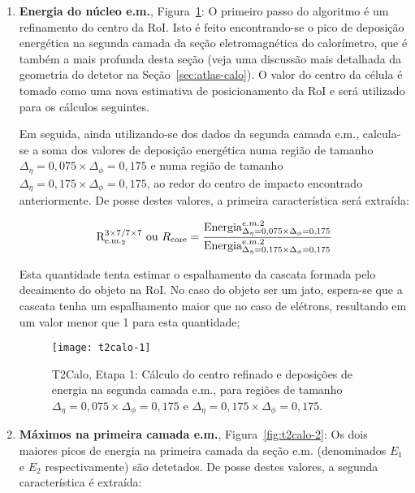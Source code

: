 \begin{enumerate}
\item \textbf{Energia do núcleo e.m.}, Figura~\ref{fig:t2calo-1}: O
primeiro passo do algoritmo é um refinamento do centro da RoI. Isto é feito
encontrando-se o pico de deposi\-ção ener\-gé\-tica na segunda camada da
se\-ção eletroma\-gné\-tica do calo\-rí\-metro, que é tam\-bém a mais profunda
desta se\-ção (veja uma discus\-são mais detalhada da geometria do detetor na
Seção~\ref{sec:atlas-calo}). O valor do centro da cé\-lula é tomado como uma
nova estimativa de posicionamento da RoI e será utilizado para os cál\-culos
seguintes.

Em seguida, ainda utilizando-se dos dados da segunda camada e.m., calcula-se a
soma dos valores de deposição energética numa região de tamanho
$\Delta_\eta=0,075\times\Delta_\phi=0,175$ e numa região de tamanho
$\Delta_\eta=0,175\times\Delta_\phi=0,175$, ao redor do centro de impacto
encontrado anteriormente. De posse destes valores, a primeira característica
será extraída:

\begin{equation}
\text{R}^{3\times7/7\times7}_{\text{e.m.}_{2}} \text{ ou } R_\text{core} = \frac{\text{Energia}^{e.m.2}_{\Delta_\eta=0,075\times\Delta_\phi=0,175}}{\text{Energia}^{e.m.2}_{\Delta_\eta=0,175\times\Delta_\phi=0,175}}
\end{equation}

Esta quantidade tenta estimar o espalhamento da cascata formada pelo
decaimento do objeto na RoI. No caso do objeto ser um jato, espera-se que a
cascata tenha um espalhamento maior que no caso de elétrons, resultando em um
valor menor que 1 para esta quantidade;

\begin{figure}
\begin{center}
\texttt{[image: t2calo-1]}
\end{center}
\caption{T2Calo, Etapa 1: Cálculo do centro refinado e deposições de
energia na segunda camada e.m., para regiões de tamanho
$\Delta_\eta=0,075\times\Delta_\phi=0,175$ e
$\Delta_\eta=0,175\times\Delta_\phi=0,175$.} 
\label{fig:t2calo-1}
\end{figure}

\item \textbf{Máximos na primeira camada e.m.}, Figura~\ref{fig:t2calo-2}: Os
dois maiores picos de energia na primeira camada da seção e.m. (denominados
$E_1$ e $E_2$ respectivamente) são detetados. De posse destes valores, a
segunda característica é extraída:


\end{enumerate}
